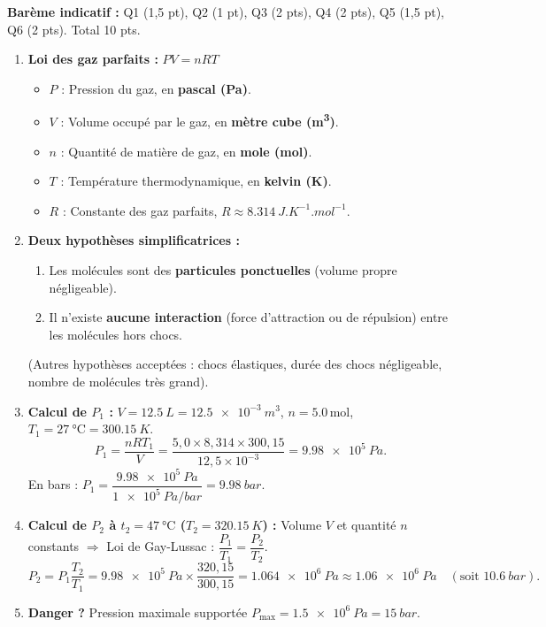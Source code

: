 \documentclass[11pt]{article}
\begin{document}
\begin{corrige}
\textbf{Barème indicatif :} Q1 (1,5 pt), Q2 (1 pt), Q3 (2 pts), Q4 (2 pts), Q5 (1,5 pt), Q6 (2 pts). Total 10 pts.
\begin{enumerate}
\item \textbf{Loi des gaz parfaits :} $P V = n R T$
      \begin{itemize}
      \item $P$ : Pression du gaz, en \textbf{pascal (\si{\pascal})}.
      \item $V$ : Volume occupé par le gaz, en \textbf{mètre cube (\si{\cubic\meter})}.
      \item $n$ : Quantité de matière de gaz, en \textbf{mole (\si{\mole})}.
      \item $T$ : Température thermodynamique, en \textbf{kelvin (\si{\kelvin})}.
      \item $R$ : Constante des gaz parfaits, $R \approx \SI{8,314}{J.K^{-1}.mol^{-1}}$.
      \end{itemize}
\item \textbf{Deux hypothèses simplificatrices :}
      \begin{enumerate}
      \item Les molécules sont des \textbf{particules ponctuelles} (volume propre négligeable).
      \item Il n'existe \textbf{aucune interaction} (force d'attraction ou de répulsion) entre les molécules hors chocs.
      \end{enumerate}
      (Autres hypothèses acceptées : chocs élastiques, durée des chocs négligeable, nombre de molécules très grand).
\item \textbf{Calcul de $P_1$ :}
      $V = \SI{12,5}{L} = \SI{12,5e-3}{m^3}$, $n = \num{5,0}\,\mathrm{mol}$, $T_1 = \SI{27}{\degreeCelsius} = \SI{300,15}{K}$.
      \[
      P_1 = \frac{n R T_1}{V} = \frac{5,0 \times 8,314 \times 300,15}{12,5 \times 10^{-3}} = \SI{9,98e5}{Pa}.
      \]
      En bars : $P_1 = \dfrac{\SI{9,98e5}{Pa}}{\SI{1e5}{Pa/bar}} = \boxed{\SI{9,98}{bar}}$.
\item \textbf{Calcul de $P_2$ à $t_2 = \SI{47}{\degreeCelsius}$ ($T_2 = \SI{320,15}{K}$) :}
      Volume $V$ et quantité $n$ constants $\Rightarrow$ Loi de Gay-Lussac : $\dfrac{P_1}{T_1} = \dfrac{P_2}{T_2}$.
      \[
      P_2 = P_1 \frac{T_2}{T_1} = \SI{9,98e5}{Pa} \times \frac{320,15}{300,15} = \SI{1,064e6}{Pa} \approx \boxed{\SI{1,06e6}{Pa}} \quad (\text{soit } \SI{10,6}{bar}).
      \]
\item \textbf{Danger ?} Pression maximale supportée $P_{\max} = \SI{1,5e6}{Pa} = \SI{15}{bar}$.

\end{enumerate}
\end{corrige}
\end{document}
